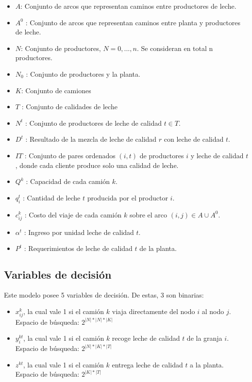 \begin{itemize}
    \item $A$: Conjunto de arcos que representan caminos entre productores de leche.
    \item $A^0$ : Conjunto de arcos que representan caminos entre planta y productores de leche.
    \item $N$: Conjunto de productores, $N = 0, ..., n$. Se consideran en total n productores.
    \item $N_0$ : Conjunto de productores y la planta.
    \item $K$: Conjunto de camiones
    \item $T$ : Conjunto de calidades de leche
    \item $N^t$ : Conjunto de productores de leche de calidad $ t \in T $.
    \item $D^t$ : Resultado de la mezcla de leche de calidad $r$ con leche de calidad $t$.
    \item $IT$ : Conjunto de pares ordenados $(i, t)$ de productores $i$ y leche de calidad $t$, donde cada cliente produce solo una calidad de leche.
    \item $Q^k$ : Capacidad de cada camión $k$.
    \item $q_i^t$ : Cantidad de leche $t$ producida por el productor $i$.
    \item $c_{i j}^{k}$ : Costo del viaje de cada camión $k$ sobre el arco $(i, j) \in A \cup A^0$.
    \item $\alpha^t$ : Ingreso por unidad leche de calidad $t$.
    \item $P^t$ : Requerimientos de leche de calidad $t$ de la planta.
\end{itemize}



\subsection{Variables de decisión}

Este modelo posee 5 variables de decisión. De estas, 3 son binarias:
\begin{itemize}
    \item $x_{i j}^k$, la cual vale 1 si el camión $k$ viaja directamente del nodo $i$ al nodo $j$. Espacio de búsqueda: $2^{|N| * |N| * |K|}$
    \item $y_{i}^{k t}$, la cual vale 1 si el camión $k$ recoge leche de calidad $t$ de la granja $i$. Espacio de búsqueda: $2^{|N| * |K| * |T|}$
    \item $z^{k t}$, la cual vale 1 si el camión $k$ entrega leche de calidad $t$ a la planta. Espacio de búsqueda: $2^{|K| * |T|}$
\end{itemize}

